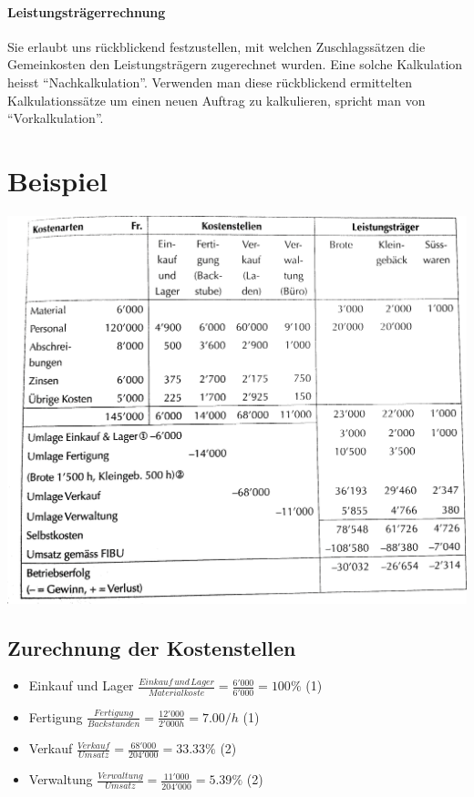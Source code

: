 \paragraph*{Leistungsträgerrechnung}

Sie erlaubt uns rückblickend festzustellen, mit welchen Zuschlagssätzen
die Gemeinkosten den Leistungsträgern zugerechnet wurden. Eine solche
Kalkulation heisst ``Nachkalkulation''. Verwenden man diese rückblickend
ermittelten Kalkulationssätze um einen neuen Auftrag zu kalkulieren,
spricht man von ``Vorkalkulation''.


\section*{Beispiel}

\includegraphics[scale=0.2]{KostenLeistungsrechnung/Kostenleistung}


\subsection*{Zurechnung der Kostenstellen}
\begin{itemize}
\item Einkauf und Lager $\frac{Einkauf\, und\, Lager}{Materialkoste}=\frac{6'000}{6'000}=100\%$
(1)
\item Fertigung $\frac{Fertigung}{Backstunden}=\frac{12'000}{2'000h}=7.00/h$
(1)
\item Verkauf $\frac{Verkauf}{Umsatz}=\frac{68'000}{204'000}=33.33\%$ (2)
\item Verwaltung $\frac{Verwaltung}{Umsatz}=\frac{11'000}{204'000}=5.39\%$
(2)\end{itemize}


